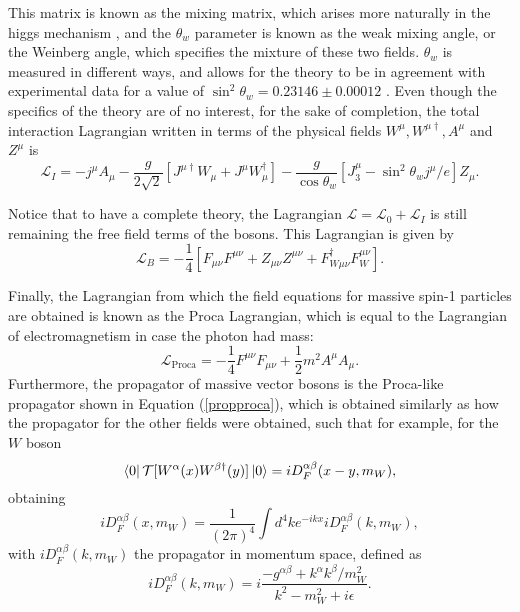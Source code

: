 This matrix is known as the mixing matrix, which arises more naturally in the higgs mechanism \cite{Thomson}, and the $\theta_w$ parameter is known as the weak mixing angle, or the Weinberg angle, which specifies the mixture of these two fields. $\theta_w$ is measured in different ways, and allows for the theory to be in agreement with experimental data for a value of $\sin^2{\theta_w} = 0.23146\pm0.00012$ \cite{Mandl}\cite{Thomson}. Even though the specifics of the theory are of no interest, for the sake of completion, the total interaction Lagrangian written in terms of the physical fields $W^{\mu}, W^{\mu\dagger}, A^{\mu}$ and $Z^{\mu}$ is
\begin{equation*}
    \mathcal{L}_I = -j^{\mu}A_{\mu} - \dfrac{g}{2\sqrt{2}}\left[J^{\mu\dagger}W_{\mu} + J^{\mu}W_{\mu}^{\dagger}\right] - \dfrac{g}{\cos{\theta_w}}\left[J^{\mu}_3 - \sin^2{\theta_w}j^{\mu}/e\right]Z_{\mu}.
\end{equation*}

Notice that to have a complete theory, the Lagrangian $\mathcal{L} = \mathcal{L}_0 + \mathcal{L}_I$ is still remaining the free field terms of the bosons. This Lagrangian is given by \cite{Mandl}
\begin{equation*}
    \mathcal{L}_B = -\dfrac{1}{4}[F_{\mu\nu}F^{\mu\nu} + Z_{\mu\nu}Z^{\mu\nu} + F_{W\mu\nu}^{\dagger}F^{\mu\nu}_W].
\end{equation*}

Finally, the Lagrangian from which the field equations for massive spin-1 particles are obtained is known as the Proca Lagrangian, which is equal to the Lagrangian of electromagnetism in case the photon had mass:
\begin{equation*}
    \mathcal{L}_{\textrm{Proca}} = -\dfrac{1}{4}F^{\mu\nu}F_{\mu\nu} + \dfrac{1}{2}m^2A^{\mu}A_{\mu}.
\end{equation*}
Furthermore, the propagator of massive vector bosons is the Proca-like propagator shown in Equation (\ref{propproca}), which is obtained similarly as how the propagator for the other fields were obtained, such that for example, for the $W$ boson
\begin{equation*}
    \bra{0}\mathcal{T}[W^{\alpha}(x)W^{\beta\dagger}(y)]\ket{0} = iD_F^{\alpha\beta}(x-y, m_W),
\end{equation*}
obtaining
\begin{equation*}
    iD_F^{\alpha\beta}(x,m_W) = \dfrac{1}{(2\pi)^4}\int d^4k e^{-ikx}iD_F^{\alpha\beta}(k,m_W),
\end{equation*}
with $iD_F^{\alpha\beta}(k,m_W)$ the propagator in momentum space, defined as
\begin{equation}
\label{propproca}
    iD_F^{\alpha\beta}(k,m_W) = i\dfrac{-g^{\alpha\beta} + k^{\alpha}k^{\beta}/m_W^2}{k^2 - m_W^2 + i\epsilon}.
\end{equation}




